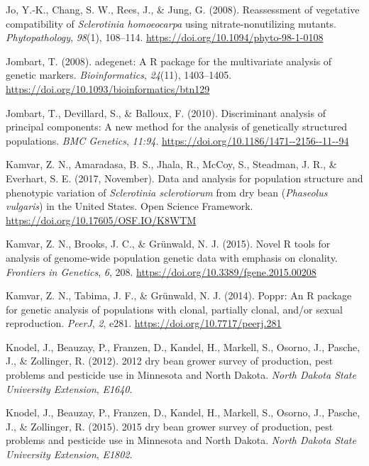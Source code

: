 \hypertarget{ref-jo2008reassessment}{}
Jo, Y.-K., Chang, S. W., Rees, J., \& Jung, G. (2008). Reassessment of
vegetative compatibility of \emph{Sclerotinia homoeocarpa} using
nitrate-nonutilizing mutants. \emph{Phytopathology}, \emph{98}(1),
108--114. \url{https://doi.org/10.1094/phyto-98-1-0108}

\hypertarget{ref-jombart2008adegenet}{}
Jombart, T. (2008). adegenet: A R package for the multivariate analysis
of genetic markers. \emph{Bioinformatics}, \emph{24}(11), 1403--1405.
\url{https://doi.org/10.1093/bioinformatics/btn129}

\hypertarget{ref-jombart2010discriminant}{}
Jombart, T., Devillard, S., \& Balloux, F. (2010). Discriminant analysis
of principal components: A new method for the analysis of genetically
structured populations. \emph{BMC Genetics}, \emph{11:94}.
\url{https://doi.org/10.1186/1471--2156--11--94}

\hypertarget{ref-kamvar2017data}{}
Kamvar, Z. N., Amaradasa, B. S., Jhala, R., McCoy, S., Steadman, J. R.,
\& Everhart, S. E. (2017, November). Data and analysis for population
structure and phenotypic variation of \emph{Sclerotinia sclerotiorum}
from dry bean (\emph{Phaseolus vulgaris}) in the United States. Open
Science Framework. \url{https://doi.org/10.17605/OSF.IO/K8WTM}

\hypertarget{ref-kamvar2015novel}{}
Kamvar, Z. N., Brooks, J. C., \& Grünwald, N. J. (2015). Novel R tools
for analysis of genome-wide population genetic data with emphasis on
clonality. \emph{Frontiers in Genetics}, \emph{6}, 208.
\url{https://doi.org/10.3389/fgene.2015.00208}

\hypertarget{ref-kamvar2014poppr}{}
Kamvar, Z. N., Tabima, J. F., \& Grünwald, N. J. (2014). Poppr: An R
package for genetic analysis of populations with clonal, partially
clonal, and/or sexual reproduction. \emph{PeerJ}, \emph{2}, e281.
\url{https://doi.org/10.7717/peerj.281}

\hypertarget{ref-knodel2012dry}{}
Knodel, J., Beauzay, P., Franzen, D., Kandel, H., Markell, S., Osorno,
J., Pasche, J., \& Zollinger, R. (2012). 2012 dry bean grower survey of
production, pest problems and pesticide use in Minnesota and North
Dakota. \emph{North Dakota State University Extension}, \emph{E1640}.

\hypertarget{ref-knodel2015dry}{}
Knodel, J., Beauzay, P., Franzen, D., Kandel, H., Markell, S., Osorno,
J., Pasche, J., \& Zollinger, R. (2015). 2015 dry bean grower survey of
production, pest problems and pesticide use in Minnesota and North
Dakota. \emph{North Dakota State University Extension}, \emph{E1802}.

